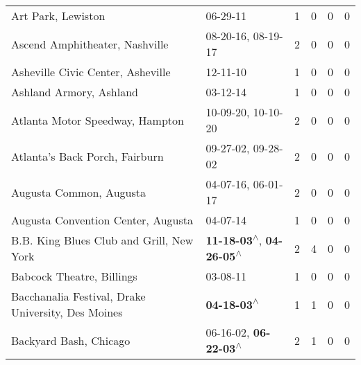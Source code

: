 \begin{supertabular}{p{0.4\textwidth}p{0.3\textwidth}p{0.05\textwidth}p{0.05\textwidth}p{0.05\textwidth}p{0.05\textwidth}}
                                                           Art Park, Lewiston &                                                                  06-29-11\textsuperscript{} &  1 &  0 &  0 &  0 \\
                                               Ascend Amphitheater, Nashville &                                      08-20-16\textsuperscript{}, 08-19-17\textsuperscript{} &  2 &  0 &  0 &  0 \\
                                            Asheville Civic Center, Asheville &                                                                  12-11-10\textsuperscript{} &  1 &  0 &  0 &  0 \\
                                                      Ashland Armory, Ashland &                                                                  03-12-14\textsuperscript{} &  1 &  0 &  0 &  0 \\
                                              Atlanta Motor Speedway, Hampton &                                      10-09-20\textsuperscript{}, 10-10-20\textsuperscript{} &  2 &  0 &  0 &  0 \\
                                               Atlanta's Back Porch, Fairburn &                                      09-27-02\textsuperscript{}, 09-28-02\textsuperscript{} &  2 &  0 &  0 &  0 \\
                                                      Augusta Common, Augusta &                                      04-07-16\textsuperscript{}, 06-01-17\textsuperscript{} &  2 &  0 &  0 &  0 \\
                                           Augusta Convention Center, Augusta &                                                                  04-07-14\textsuperscript{} &  1 &  0 &  0 &  0 \\
                                     B.B. King Blues Club and Grill, New York &    \textbf{11-18-03\textsuperscript{$\wedge$}}, \textbf{04-26-05\textsuperscript{$\wedge$}} &  2 &  4 &  0 &  0 \\
                                                    Babcock Theatre, Billings &                                                                  03-08-11\textsuperscript{} &  1 &  0 &  0 &  0 \\
                           Bacchanalia Festival, Drake University, Des Moines &                                                 \textbf{04-18-03\textsuperscript{$\wedge$}} &  1 &  1 &  0 &  0 \\
                                                       Backyard Bash, Chicago &                     06-16-02\textsuperscript{}, \textbf{06-22-03\textsuperscript{$\wedge$}} &  2 &  1 &  0 &  0 \\

\end{supertabular}
